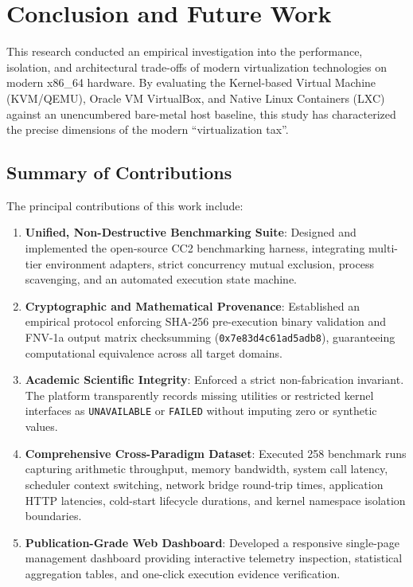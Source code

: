 \section{Conclusion and Future Work}
\label{sec:conclusion}

This research conducted an empirical investigation into the performance, isolation, and architectural trade-offs of modern virtualization technologies on modern x86\_64 hardware. By evaluating the Kernel-based Virtual Machine (KVM/QEMU), Oracle VM VirtualBox, and Native Linux Containers (LXC) against an unencumbered bare-metal host baseline, this study has characterized the precise dimensions of the modern ``virtualization tax''.

\subsection{Summary of Contributions}
\label{subsec:contributions_summary}

The principal contributions of this work include:
\begin{enumerate}
    \item \textbf{Unified, Non-Destructive Benchmarking Suite}: Designed and implemented the open-source CC2 benchmarking harness, integrating multi-tier environment adapters, strict concurrency mutual exclusion, process scavenging, and an automated execution state machine.
    \item \textbf{Cryptographic and Mathematical Provenance}: Established an empirical protocol enforcing SHA-256 pre-execution binary validation and FNV-1a output matrix checksumming (\texttt{0x7e83d4c61ad5adb8}), guaranteeing computational equivalence across all target domains.
    \item \textbf{Academic Scientific Integrity}: Enforced a strict non-fabrication invariant. The platform transparently records missing utilities or restricted kernel interfaces as \texttt{UNAVAILABLE} or \texttt{FAILED} without imputing zero or synthetic values.
    \item \textbf{Comprehensive Cross-Paradigm Dataset}: Executed 258 benchmark runs capturing arithmetic throughput, memory bandwidth, system call latency, scheduler context switching, network bridge round-trip times, application HTTP latencies, cold-start lifecycle durations, and kernel namespace isolation boundaries.
    \item \textbf{Publication-Grade Web Dashboard}: Developed a responsive single-page management dashboard providing interactive telemetry inspection, statistical aggregation tables, and one-click execution evidence verification.
\end{enumerate}

